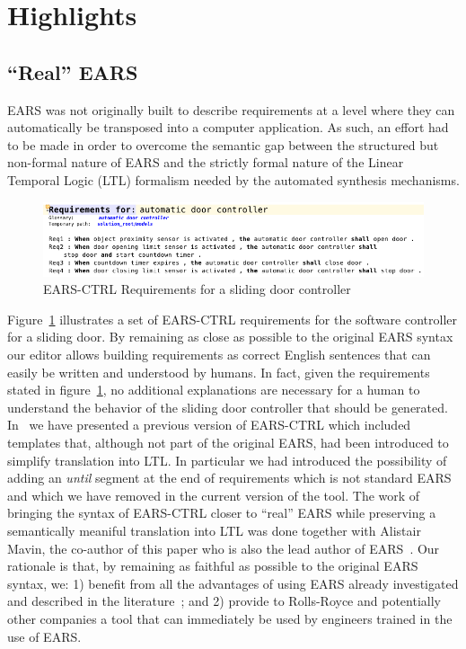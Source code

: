 \section{Highlights}
\vspace{-.2cm}
\subsection{``Real'' EARS}
EARS was not originally built to describe requirements at a level where they can
automatically be transposed into a computer application. As such, an effort had
to be made in order to overcome the semantic gap between the structured but
non-formal nature of EARS and the strictly formal nature of the Linear Temporal
Logic (LTL) formalism needed by the automated synthesis
mechanisms.\vspace{-.5cm} \begin{figure}[h!]
   \begin{center}
     \includegraphics[width=1\textwidth]{images/EARS-Reqs.png}
     \caption{\textsf{EARS-CTRL} Requirements for a sliding door
     controller}
     \label{fig:ears_reqs}
   \end{center} 
 \end{figure}
\vspace{-1cm}Figure~\ref{fig:ears_reqs} illustrates a set of \textsf{EARS-CTRL}
requirements for the software controller for a sliding door. By remaining as close as
possible to the original EARS syntax our editor allows building requirements as
correct English sentences that can easily be written and understood by humans.
In fact, given the requirements stated in figure~\ref{fig:ears_reqs}, no
additional explanations are necessary for a human to understand the behavior of
the sliding door controller that should be generated. In~\cite{LucioRCM17} we
have presented a previous version of \textsf{EARS-CTRL} which included templates
that, although not part of the original EARS, had been introduced to simplify
translation into LTL. In particular we had introduced the possibility of adding
an \emph{until} segment at the end of requirements which is not standard EARS
and which we have removed in the current version of the tool.
The work of bringing the syntax of \textsf{EARS-CTRL} closer to ``real'' EARS
while preserving a semantically meaniful translation into LTL was done together with Alistair Mavin, the
co-author of this paper who is also the lead author of EARS~\cite{EARS09}.
Our rationale is that, by remaining as faithful as possible to the original EARS
syntax, we: 1) benefit from all the advantages of using EARS already
investigated and described in the literature~\cite{EARS09,EARS16}; and 2)
provide to Rolls-Royce and potentially other companies a tool that can
immediately be used by engineers trained in the use of EARS.\vspace{-.5cm}

